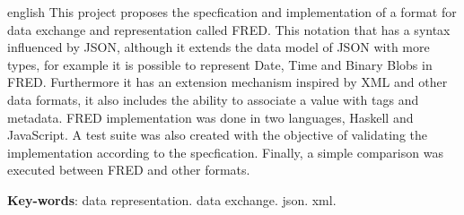 \begin{resumo}[Abstract]
 \begin{otherlanguage*}{english}
   This project proposes the specfication and implementation of a format
   for data exchange and representation called FRED. This notation that 
   has a syntax influenced by JSON, although it extends the data model of 
   JSON with more types, for example it is possible to represent Date, 
   Time and Binary Blobs in FRED. Furthermore it has an extension mechanism 
   inspired by XML and other data formats, it also includes the ability 
   to associate a value with tags and metadata.
   FRED implementation was done in two languages, Haskell and JavaScript.
   A test suite was also created with the objective of validating the implementation
   according to the specfication. Finally, a simple comparison was executed
   between FRED and other formats.

   \vspace{\onelineskip}
 
   \noindent 
   \textbf{Key-words}: data representation. data exchange. json. xml.
 \end{otherlanguage*}
\end{resumo}
